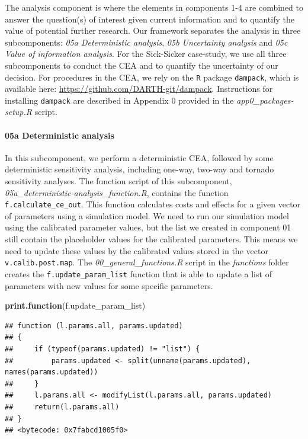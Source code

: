\documentclass[]{article}
\newenvironment{Shaded}{\begin{snugshade}}{\end{snugshade}}
\newcommand{\KeywordTok}[1]{\textcolor[rgb]{0.13,0.29,0.53}{\textbf{#1}}}
\newcommand{\NormalTok}[1]{#1}
\let\oldparagraph\paragraph
\renewcommand{\paragraph}[1]{\oldparagraph{#1}\mbox{}}
\begin{document}
The analysis component is where the elements in components 1-4 are
combined to answer the question(s) of interest given current information
and to quantify the value of potential further research. Our framework
separates the analysis in three subcomponents: \emph{05a Deterministic
analysis}, \emph{05b Uncertainty analysis} and \emph{05c Value of
information analysis}. For the Sick-Sicker case-study, we use all three
subcomponents to conduct the CEA and to quantify the uncertainty of our
decision. For procedures in the CEA, we rely on the \texttt{R} package
\texttt{dampack}, which is available here:
\url{https://github.com/DARTH-git/dampack}. Instructions for installing
\texttt{dampack} are described in Appendix 0 provided in the
\emph{app0\_packages-setup.R} script.

\paragraph{05a Deterministic analysis}\label{a-deterministic-analysis}

In this subcomponent, we perform a deterministic CEA, followed by some
deterministic sensitivity analysis, including one-way, two-way and
tornado sensitivity analyses. The function script of this subcomponent,
\emph{05a\_deterministic-analysis\_function.R}, contains the function
\texttt{f.calculate\_ce\_out}. This function calculates costs and
effects for a given vector of parameters using a simulation model. We
need to run our simulation model using the calibrated parameter values,
but the list we created in component 01 still contain the placeholder
values for the calibrated parameters. This means we need to update these
values by the calibrated values stored in the vector
\texttt{v.calib.post.map}. The \emph{00\_general\_functions.R} script in
the \emph{functions} folder creates the \texttt{f.update\_param\_list}
function that is able to update a list of parameters with new values for
some specific parameters.

\begin{Shaded}
\begin{Highlighting}[]
\KeywordTok{print.function}\NormalTok{(f.update_param_list)}
\end{Highlighting}
\end{Shaded}

\begin{verbatim}
## function (l.params.all, params.updated) 
## {
##     if (typeof(params.updated) != "list") {
##         params.updated <- split(unname(params.updated), names(params.updated))
##     }
##     l.params.all <- modifyList(l.params.all, params.updated)
##     return(l.params.all)
## }
## <bytecode: 0x7fabcd1005f0>
\end{verbatim}
\end{document}
